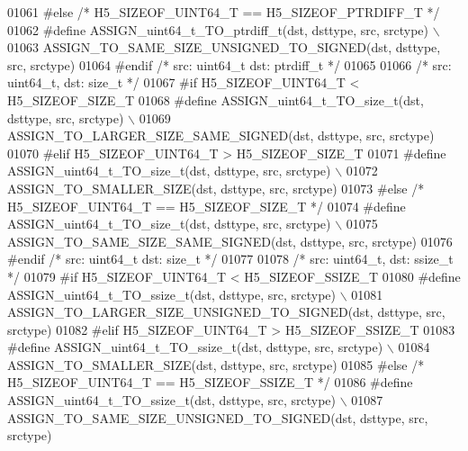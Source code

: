 \begin{DoxyCode}
01061 \textcolor{preprocessor}{#else }\textcolor{comment}{/* H5\_SIZEOF\_UINT64\_T == H5\_SIZEOF\_PTRDIFF\_T */}\textcolor{preprocessor}{}
01062 \textcolor{preprocessor}{    #define ASSIGN\_uint64\_t\_TO\_ptrdiff\_t(dst, dsttype, src, srctype) \(\backslash\)}
01063 \textcolor{preprocessor}{        ASSIGN\_TO\_SAME\_SIZE\_UNSIGNED\_TO\_SIGNED(dst, dsttype, src, srctype)}
01064 \textcolor{preprocessor}{#endif }\textcolor{comment}{/* src: uint64\_t dst: ptrdiff\_t */}\textcolor{preprocessor}{}
01065 
01066 \textcolor{comment}{/* src: uint64\_t, dst: size\_t */}
01067 \textcolor{preprocessor}{#if H5\_SIZEOF\_UINT64\_T < H5\_SIZEOF\_SIZE\_T}
01068 \textcolor{preprocessor}{    #define ASSIGN\_uint64\_t\_TO\_size\_t(dst, dsttype, src, srctype) \(\backslash\)}
01069 \textcolor{preprocessor}{        ASSIGN\_TO\_LARGER\_SIZE\_SAME\_SIGNED(dst, dsttype, src, srctype)}
01070 \textcolor{preprocessor}{#elif H5\_SIZEOF\_UINT64\_T > H5\_SIZEOF\_SIZE\_T}
01071 \textcolor{preprocessor}{    #define ASSIGN\_uint64\_t\_TO\_size\_t(dst, dsttype, src, srctype) \(\backslash\)}
01072 \textcolor{preprocessor}{        ASSIGN\_TO\_SMALLER\_SIZE(dst, dsttype, src, srctype)}
01073 \textcolor{preprocessor}{#else }\textcolor{comment}{/* H5\_SIZEOF\_UINT64\_T == H5\_SIZEOF\_SIZE\_T */}\textcolor{preprocessor}{}
01074 \textcolor{preprocessor}{    #define ASSIGN\_uint64\_t\_TO\_size\_t(dst, dsttype, src, srctype) \(\backslash\)}
01075 \textcolor{preprocessor}{        ASSIGN\_TO\_SAME\_SIZE\_SAME\_SIGNED(dst, dsttype, src, srctype)}
01076 \textcolor{preprocessor}{#endif }\textcolor{comment}{/* src: uint64\_t dst: size\_t */}\textcolor{preprocessor}{}
01077 
01078 \textcolor{comment}{/* src: uint64\_t, dst: ssize\_t */}
01079 \textcolor{preprocessor}{#if H5\_SIZEOF\_UINT64\_T < H5\_SIZEOF\_SSIZE\_T}
01080 \textcolor{preprocessor}{    #define ASSIGN\_uint64\_t\_TO\_ssize\_t(dst, dsttype, src, srctype) \(\backslash\)}
01081 \textcolor{preprocessor}{        ASSIGN\_TO\_LARGER\_SIZE\_UNSIGNED\_TO\_SIGNED(dst, dsttype, src, srctype)}
01082 \textcolor{preprocessor}{#elif H5\_SIZEOF\_UINT64\_T > H5\_SIZEOF\_SSIZE\_T}
01083 \textcolor{preprocessor}{    #define ASSIGN\_uint64\_t\_TO\_ssize\_t(dst, dsttype, src, srctype) \(\backslash\)}
01084 \textcolor{preprocessor}{        ASSIGN\_TO\_SMALLER\_SIZE(dst, dsttype, src, srctype)}
01085 \textcolor{preprocessor}{#else }\textcolor{comment}{/* H5\_SIZEOF\_UINT64\_T == H5\_SIZEOF\_SSIZE\_T */}\textcolor{preprocessor}{}
01086 \textcolor{preprocessor}{    #define ASSIGN\_uint64\_t\_TO\_ssize\_t(dst, dsttype, src, srctype) \(\backslash\)}
01087 \textcolor{preprocessor}{        ASSIGN\_TO\_SAME\_SIZE\_UNSIGNED\_TO\_SIGNED(dst, dsttype, src, srctype)}

\end{DoxyCode}
